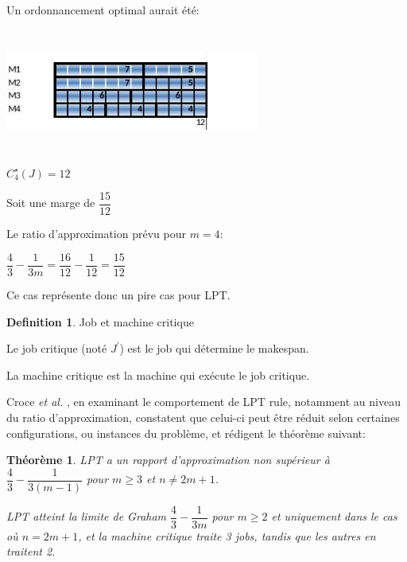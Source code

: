 \documentclass[a4paper,12pt]{report}
\theoremstyle{plain}				%
\newtheorem{theoreme1}{Théorème}	%
\theoremstyle{definition}				%
\newtheorem{definition1}{Definition} %
\begin{document}
\bigskip

\begin{minipage}{\linewidth}

\begin{flushleft}
Un ordonnancement optimal aurait été:
\end{flushleft}

{\centering
\includegraphics[width=8.334cm,height=4.034cm]{Biblio_PCmax_Rendu_exLPT_Rev2.jpg}
\par}


\begin{flushleft}
$C_4^{\star}(J)=12$
\end{flushleft}

\end{minipage}

Soit une marge de $\dfrac{15}{12}$

Le ratio d'approximation prévu pour $m=4$:

$\dfrac{4}{3} - \dfrac{1}{3m}=\dfrac{16}{12} - \dfrac{1}{12}=\dfrac{15}{12}$

Ce cas représente donc un pire cas pour LPT.

\bigskip
\begin{definition1}{Job et machine critique}

Le job critique (noté $J^\prime$) est le job qui détermine le
makespan.

La machine critique est la machine qui exécute le job critique.
\end{definition1}


\bigskip

Croce \textit{et al.}
\cite{della2018longest}, en examinant le comportement de LPT rule,
notamment au niveau du ratio d'approximation, constatent que celui-ci
peut être réduit selon certaines configurations, ou instances du
problème, et rédigent le théorème suivant:

\bigskip

\begin{theoreme1}
  LPT a un rapport d'approximation non supérieur à
  $\dfrac{4}{3} - \dfrac{1}{3(m-1)}$ pour $m \geq 3$ et $n \neq 2m+1$.

  LPT atteint la limite de Graham $\dfrac{4}{3} - \dfrac{1}{3m}$ pour
  $m \geq 2$ et uniquement dans le cas où $n=2m+1$, et la machine
  critique traite 3 jobs, tandis que les autres en traitent 2.

\end{theoreme1}
\end{document}
